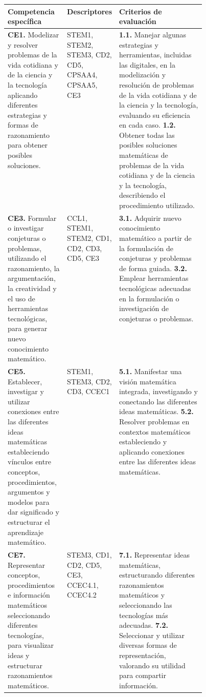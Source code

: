 \documentclass[11pt,a4paper]{article}
\begin{document}
{\small
\renewcommand{\arraystretch}{1.25}
\begin{tabularx}{\linewidth}{>{\raggedright\arraybackslash}p{0.30\linewidth}
    >{\raggedright\arraybackslash}p{0.15\linewidth}
    >{\raggedright\arraybackslash}X}
\toprule
\textbf{Competencia específica} & \textbf{Descriptores} & \textbf{Criterios de evaluación} \\
\midrule
\textbf{CE1.} Modelizar y resolver problemas de la vida cotidiana y de la
ciencia y la tecnología aplicando diferentes estrategias y formas de
razonamiento para obtener posibles soluciones.
& STEM1, STEM2, STEM3, CD2, CD5, CPSAA4, CPSAA5, CE3
& \textbf{1.1.} Manejar algunas estrategias y herramientas, incluidas las
digitales, en la modelización y resolución de problemas de la vida cotidiana
y de la ciencia y la tecnología, evaluando su eficiencia en cada caso.\newline
\textbf{1.2.} Obtener todas las posibles soluciones matemáticas de problemas
de la vida cotidiana y de la ciencia y la tecnología, describiendo el
procedimiento utilizado. \\
\midrule
\textbf{CE3.} Formular o investigar conjeturas o problemas, utilizando el
razonamiento, la argumentación, la creatividad y el uso de herramientas
tecnológicas, para generar nuevo conocimiento matemático.
& CCL1, STEM1, STEM2, CD1, CD2, CD3, CD5, CE3
& \textbf{3.1.} Adquirir nuevo conocimiento matemático a partir de la
formulación de conjeturas y problemas de forma guiada.\newline
\textbf{3.2.} Emplear herramientas tecnológicas adecuadas en la formulación o
investigación de conjeturas o problemas. \\
\midrule
\textbf{CE5.} Establecer, investigar y utilizar conexiones entre las
diferentes ideas matemáticas estableciendo vínculos entre conceptos,
procedimientos, argumentos y modelos para dar significado y estructurar el
aprendizaje matemático.
& STEM1, STEM3, CD2, CD3, CCEC1
& \textbf{5.1.} Manifestar una visión matemática integrada, investigando y
conectando las diferentes ideas matemáticas.\newline
\textbf{5.2.} Resolver problemas en contextos matemáticos estableciendo y
aplicando conexiones entre las diferentes ideas matemáticas. \\
\midrule
\textbf{CE7.} Representar conceptos, procedimientos e información matemáticos
seleccionando diferentes tecnologías, para visualizar ideas y estructurar
razonamientos matemáticos.
& STEM3, CD1, CD2, CD5, CE3, CCEC4.1, CCEC4.2
& \textbf{7.1.} Representar ideas matemáticas, estructurando diferentes
razonamientos matemáticos y seleccionando las tecnologías más adecuadas.\newline
\textbf{7.2.} Seleccionar y utilizar diversas formas de representación,
valorando su utilidad para compartir información. \\
\bottomrule
\end{tabularx}
}
\end{document}
